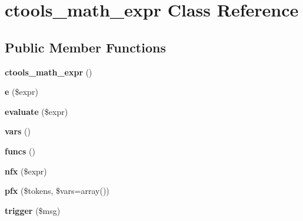 \hypertarget{classctools__math__expr}{
\section{ctools\_\-math\_\-expr Class Reference}
\label{classctools__math__expr}
}
\subsection*{Public Member Functions}
\begin{DoxyCompactItemize}
\item 
\hypertarget{classctools__math__expr_a9f9061dcb1ee02c59b0153b17c9d832a}{
{\bfseries ctools\_\-math\_\-expr} ()}
\label{classctools__math__expr_a9f9061dcb1ee02c59b0153b17c9d832a}

\item 
\hypertarget{classctools__math__expr_a137579f86e6b561a269d4bc5167b2d46}{
{\bfseries e} (\$expr)}
\label{classctools__math__expr_a137579f86e6b561a269d4bc5167b2d46}

\item 
\hypertarget{classctools__math__expr_af1c2244057857dda0fb65562fbdafc98}{
{\bfseries evaluate} (\$expr)}
\label{classctools__math__expr_af1c2244057857dda0fb65562fbdafc98}

\item 
\hypertarget{classctools__math__expr_a7c2b97c535bd286a6923154a91cc93b9}{
{\bfseries vars} ()}
\label{classctools__math__expr_a7c2b97c535bd286a6923154a91cc93b9}

\item 
\hypertarget{classctools__math__expr_a8556f4e2432a5293af5a24a196ef8ef9}{
{\bfseries funcs} ()}
\label{classctools__math__expr_a8556f4e2432a5293af5a24a196ef8ef9}

\item 
\hypertarget{classctools__math__expr_aa86531acdf1c1fa2bb3d284eb8919828}{
{\bfseries nfx} (\$expr)}
\label{classctools__math__expr_aa86531acdf1c1fa2bb3d284eb8919828}

\item 
\hypertarget{classctools__math__expr_af615f30d67c23e2251cde8b2d4fada0e}{
{\bfseries pfx} (\$tokens, \$vars=array())}
\label{classctools__math__expr_af615f30d67c23e2251cde8b2d4fada0e}

\item 
\hypertarget{classctools__math__expr_aa875ccc521da0d5b3de912341786257d}{
{\bfseries trigger} (\$msg)}
\label{classctools__math__expr_aa875ccc521da0d5b3de912341786257d}

\end{DoxyCompactItemize}
